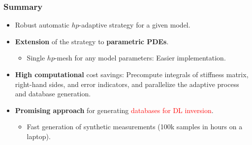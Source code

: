 \documentclass[10pt,aspectratio=149]{beamer}
\begin{document}
\begin{frame}
	\frametitle{Summary}
	
	\begin{itemize}
		\item Robust automatic $hp$-adaptive strategy for a given model.
	\end{itemize}
	
	\vspace{5mm}
	
	\begin{itemize}
		\item \textbf{Extension} of the strategy to \textbf{parametric PDEs}.
		\begin{itemize}
			\item Single $hp$-mesh for any model parameters: Easier implementation.
		\end{itemize}
	\end{itemize}
	
	\vspace{5mm}
	
	\begin{itemize}
		\item \textbf{High computational} cost savings: Precompute integrals of stiffness matrix, right-hand sides, and error indicators, and parallelize the adaptive process and database generation.
	\end{itemize}
	
	\vspace{5mm}
	
	\begin{itemize}
		\item \textbf{Promising approach} for generating \textcolor{red}{databases for DL inversion}.
		\begin{itemize}
			\item Fast generation of synthetic measurements (100k samples in hours on a laptop).
		\end{itemize}
	\end{itemize}
	
\end{frame}
\end{document}
